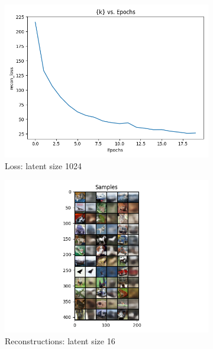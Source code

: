 \documentclass[11pt,addpoints,answers]{exam}
\numberwithin{equation}{section} %
\numberwithin{figure}{section} %
\numberwithin{table}{section} %
\begin{document}
\begin{questions}
\begin{figure}[H]
    \begin{subfigure}[b]{0.32\linewidth}
        \includegraphics[width=\linewidth]{2.1_1024_loss.png}
        \caption{Loss: latent size 1024}
    \end{subfigure}
    \begin{subfigure}[b]{0.32\linewidth}
    \includegraphics[width=\linewidth]{2.1_16_recon.png}
    \caption{Reconstructions: latent size 16}
    \end{subfigure}
    \begin{subfigure}[b]{0.32\linewidth}

\end{subfigure}
\end{figure}
\end{questions}
\end{document}
